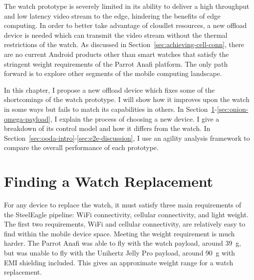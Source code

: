 The watch prototype is severely limited in its ability to deliver a high throughput and low latency video stream to the edge, hindering the benefits of edge computing. In order to better take advantage of cloudlet resources, a new offload device is needed which can transmit the video stream without the thermal restrictions of the watch. As discussed in Section~\ref{sec:achieving-cell-conn}, there are no current Android products other than smart watches that satisfy the stringent weight requirements of the Parrot Anafi platform. The only path forward is to explore other segments of the mobile computing landscape.

In this chapter, I propose a new offload device which fixes some of the shortcomings of the watch prototype. I will show how it improves upon the watch in some ways but fails to match its capabilities in others. In Section~\ref{sec:watch-replacement}-\ref{sec:onion-omega-payload}, I explain the process of choosing a new device. I give a breakdown of its control model and how it differs from the watch. In Section~\ref{sec:ooda-intro}-\ref{sec:e2e-discussion}, I use an agility analysis framework to compare the overall performance of each prototype.

\section{Finding a Watch Replacement}
\label{sec:watch-replacement}

For any device to replace the watch, it must satisfy three main requirements of the SteelEagle pipeline: WiFi connectivity, cellular connectivity, and light weight. The first two requirements, WiFi and cellular connectivity, are relatively easy to find within the mobile device space. Meeting the weight requirement is much harder. The Parrot Anafi was able to fly with the watch payload, around 39~g, but was unable to fly with the Unihertz Jelly Pro payload, around 90~g with EMI shielding included. This gives an approximate weight range for a watch replacement.


